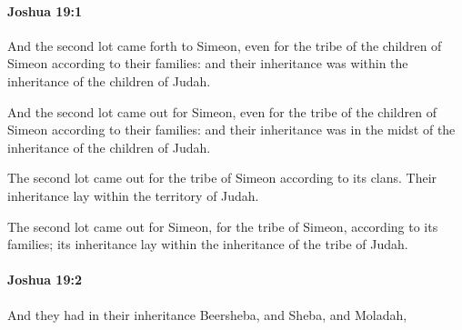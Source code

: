 		\paragraph{Joshua 19:1} %
			\label{JOSHUA-19-1}

			And the second lot came forth to Simeon, even for the tribe of the children of Simeon according to their families: and their inheritance was within the inheritance of the children of Judah.

			\begin{versebox}
					\item[BHS] 
					\item[ASV] And the second lot came out for Simeon, even for the tribe of the children of Simeon according to their families: and their inheritance was in the midst of the inheritance of the children of Judah.
					\item[NIV] The second lot came out for the tribe of Simeon according to its clans. Their inheritance lay within the territory of Judah.
					\item[NRSV] The second lot came out for Simeon, for the tribe of Simeon, according to its families; its inheritance lay within the inheritance of the tribe of Judah.
			\end{versebox}

		\paragraph{Joshua 19:2} %
			\label{JOSHUA-19-2}

			And they had in their inheritance Beersheba, and Sheba, and Moladah,

